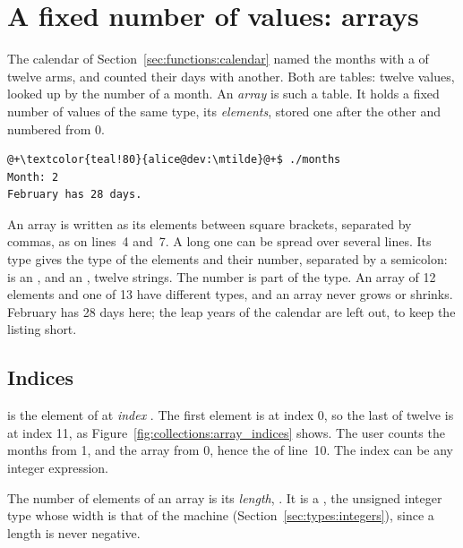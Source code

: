 \vfill\pagebreak
\section{A fixed number of values: arrays}
\label{sec:collections:arrays}

The calendar of Section~\ref{sec:functions:calendar} named the months with a
 of twelve arms, and counted their days with another. Both are
tables: twelve values, looked up by the number of a month. An \textit{array} is
such a table. It holds a fixed number of values of the same type, its
\textit{elements}, stored one after the other and numbered from 0.


\vspace{-10pt}%
\begin{lstlisting}[style=bashVerb, escapechar=@+]
@+\textcolor{teal!80}{alice@dev:\mtilde}@+$ ./months
Month: 2
February has 28 days.
\end{lstlisting}

An array is written as its elements between square brackets, separated by
commas, as on lines~4 and~7. A long one can be spread over several lines. Its
type gives the type of the elements and their number, separated by a semicolon:
 is an \token{[i32 ; 12]}, and  an
\token{[[c8] ; 12]}, twelve strings. The number is part of the type. An array of
12 elements and one of 13 have different types, and an array never grows or
shrinks. February has 28 days here; the leap years of the calendar are left
out, to keep the listing short.

\subsection{Indices}

 is the element of  at \textit{index} . The
first element is at index 0, so the last of twelve is at index 11, as
Figure~\ref{fig:collections:array_indices} shows. The user counts the months
from 1, and the array from 0, hence the  of line~10. The index
can be any integer expression.



The number of elements of an array is its \textit{length}, . It
is a , the unsigned integer type whose width is that of the
machine (Section~\ref{sec:types:integers}), since a length is never negative.

